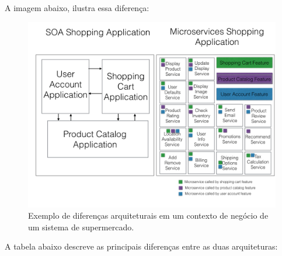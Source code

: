 A imagem abaixo, ilustra essa diferença:

\begin{figure}[H]
	\centering
	\includegraphics[width=15cm]{figuras/microsservicos.png}
	\caption{Exemplo de diferenças arquiteturais em um contexto de negócio de um sistema de supermercado.
	} \label{microsservicos}
\end{figure}

A tabela abaixo descreve as principais diferenças entre as duas arquiteturas:

